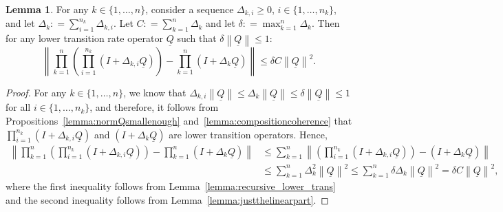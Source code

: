 \documentclass[10pt,a4paper]{paper}
\theoremstyle{definition}
\newtheorem{lemma}[theorem]{Lemma}
\newcommand{\lrate}{\underline{Q}}
\newcommand{\norm}[1]{\left\lVert #1 \right\rVert}
\newcommand{\coloneqq}{:\!=}
\begin{document}
\begin{lemma}\label{lemma:differencebetweennested}
For any $k\in\{1,\dots,n\}$, consider a sequence $\Delta_{k,i}\geq 0$, $i\in\{1,\dots,n_k\}$, and let $\Delta_k\coloneqq\sum_{i=1}^{n_k}\Delta_{k,i}$. Let $C\coloneqq\sum_{k=1}^n\Delta_k$ and let $\delta\coloneqq\max_{k=1}^n\Delta_k$. Then for any lower transition rate operator $\lrate$ such that $\delta\norm{\lrate}\leq1$:
\begin{equation*}
\norm{\prod_{k=1}^n\left(\prod_{i=1}^{n_k}(I+\Delta_{k,i}\lrate)\right)
-
\prod_{k=1}^n(I+\Delta_k\lrate)
}
\leq\delta C\norm{\lrate}^2.
\end{equation*}
\end{lemma}
\begin{proof}
For any $k\in\{1,\dots,n\}$, we know that $\Delta_{k,i}\norm{\lrate}\leq\Delta_k\norm{\lrate}\leq\delta\norm{\lrate}\leq1$ for all $i\in\{1,\dots,n_k\}$, and therefore, it follows from Propositions~\ref{lemma:normQsmallenough} and~\ref{lemma:compositioncoherence} that $\prod_{i=1}^{n_k}(I+\Delta_{k,i}\lrate)$ and $(I+\Delta_k\lrate)$ are lower transition operators. Hence,
\begin{align*}
\norm{\prod_{k=1}^n\left(\prod_{i=1}^{n_k}(I+\Delta_{k,i}\lrate)\right)
-
\prod_{k=1}^n(I+\Delta_k\lrate)
}
&\leq
\sum_{k=1}^n
\norm{
	\left(\prod_{i=1}^{n_k}(I+\Delta_{k,i}\lrate)\right)
	-
	(I+\Delta_k\lrate)
}\\
&\leq
\sum_{k=1}^n
\Delta_k^2\norm{\lrate}^2
\leq
\sum_{k=1}^n
\delta\Delta_k\norm{\lrate}^2
=\delta C\norm{\lrate}^2,
\end{align*}
where the first inequality follows from Lemma~\ref{lemma:recursive_lower_trans} and the second inequality follows from Lemma~\ref{lemma:justthelinearpart}.
\end{proof}
\end{document}
